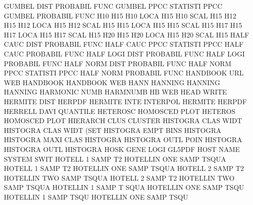 GUMBEL   DIST                           PROBABIL FUNC
GUMBEL   PPCC                           STATISTI PPCC
GUMBEL                                  PROBABIL FUNC
H10                                     H15
H10      LOCA                           H15
H10      SCAL                           H15
H12                                     H15
H12      LOCA                           H15
H12      SCAL                           H15
H15      LOCA                           H15
H15      SCAL                           H15
H17                                     H15
H17      LOCA                           H15
H17      SCAL                           H15
H20                                     H15
H20      LOCA                           H15
H20      SCAL                           H15
HALF     CAUC DIST                      PROBABIL FUNC
HALF     CAUC PPCC                      STATISTI PPCC
HALF     CAUC                           PROBABIL FUNC
HALF     LOGI DIST                      PROBABIL FUNC
HALF     LOGI                           PROBABIL FUNC
HALF     NORM DIST                      PROBABIL FUNC
HALF     NORM PPCC                      STATISTI PPCC
HALF     NORM                           PROBABIL FUNC
HANDBOOK URL                            WEB      HANDBOOK
HANDBOOK                                WEB
HANN                                    HANNING
HANNING                                 HANNING
HARMONIC NUMB                           HARMNUMB
HB                                      WEB
HEAD                                    WRITE
HERMITE  DIST                           HERPDF
HERMITE  INTE                           INTERPOL
HERMITE                                 HERPDF
HERRELL  DAVI                           QUANTILE
HETEROSC                                HOMOSCED PLOT
HETEROS                                 HOMOSCED PLOT
HIERARCH CLUS                           CLUSTER
HISTOGRA CLAS WIDT                      HISTOGRA CLAS WIDT (SET
HISTOGRA EMPT BINS                      HISTOGRA
HISTOGRA MAXI CLAS                      HISTOGRA
HISTOGRA OUTL POIN                      HISTOGRA
HISTOGRA OUTL                           HISTOGRA
HOSK     GENE LOGI                      GL5PDF
HOST     NAME                           SYSTEM   SWIT
HOTELL   1    SAMP T2                   HOTELLIN ONE  SAMP TSQUA
HOTELL   1    SAMP T2                   HOTELLIN ONE  SAMP TSQUA
HOTELL   2    SAMP T2                   HOTELLIN TWO  SAMP TSQUA
HOTELL   2    SAMP T2                   HOTELLIN TWO  SAMP TSQUA
HOTELLIN 1    SAMP T    SQUA            HOTELLIN ONE  SAMP TSQU
HOTELLIN 1    SAMP TSQU                 HOTELLIN ONE  SAMP TSQU
